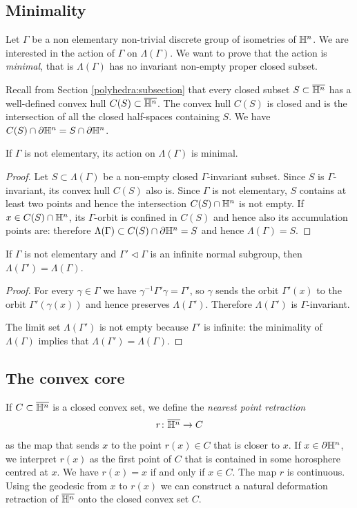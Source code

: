 \subsection{Minimality}
Let $\Gamma$ be a non elementary non-trivial discrete group of isometries of $\mathbb{H}^n$.
We are interested in the action of $\Gamma$ on $\Lambda(\Gamma)$. We want to prove that the action is \emph{minimal}, that is $\Lambda(\Gamma)$ has no invariant non-empty proper closed subset.

Recall from Section \ref{polyhedra:subsection} that every closed subset $S\subset \overline{\mathbb{H}^n}$ has a well-defined convex hull $C(S)\subset \overline{\mathbb{H}^n}$. The convex hull $C(S)$ is closed and is the intersection of all the closed half-spaces containing $S$. We have $C(S) \cap \partial \mathbb{H}^n = S \cap \partial \mathbb{H}^n$.

\begin{prop}
If $\Gamma$ is not elementary, its action on $\Lambda(\Gamma)$ is minimal.
\end{prop}
\begin{proof}
Let $S\subset \Lambda(\Gamma)$ be a non-empty closed $\Gamma$-invariant subset. Since $S$ is $\Gamma$-invariant, its convex hull $C(S)$ also is. Since $\Gamma$ is not elementary, $S$ contains at least two points and hence the intersection $C(S)\cap \mathbb{H}^n$ is not empty. If $x\in C(S)\cap \mathbb{H}^n$, its $\Gamma$-orbit is confined in $C(S)$ and hence also its accumulation points are: therefore $\Lambda(\Gamma)\subset C(S)\cap \partial \mathbb{H}^n = S$ and hence $\Lambda(\Gamma) = S$.
\end{proof}

\begin{cor} \label{normal:limit:cor}
If $\Gamma$ is not elementary and $\Gamma' \triangleleft \Gamma$ is an infinite normal subgroup, then $\Lambda(\Gamma') = \Lambda (\Gamma)$.
\end{cor}
\begin{proof}
For every $\gamma \in \Gamma$ we have $\gamma^{-1}\Gamma' \gamma = \Gamma'$, so $\gamma$ sends the orbit $\Gamma'(x)$ to the orbit $\Gamma'(\gamma(x))$ and hence preserves $\Lambda(\Gamma')$. Therefore $\Lambda(\Gamma')$ is $\Gamma$-invariant.

The limit set $\Lambda(\Gamma')$ is not empty because $\Gamma'$ is infinite: the minimality of $\Lambda(\Gamma)$ implies that $\Lambda(\Gamma') = \Lambda(\Gamma)$.
\end{proof}

\subsection{The convex core}
If $C\subset \overline{\mathbb{H}^n}$ is a closed convex set, we define the \emph{nearest point retraction} 
$$r\colon \overline{\mathbb{H}^n} \to C$$ 
as the map that sends $x$ to the point $r(x)\in C$ that is closer to $x$. If $x\in\partial \mathbb{H}^n$, we interpret $r(x)$ as the first point of $C$ that is contained in some horosphere centred at $x$. We have $r(x)=x$ if and only if $x\in C$. The map $r$ is continuous. Using the geodesic from $x$ to $r(x)$ we can construct a natural deformation retraction of $\overline{\mathbb{H}^n}$ onto the closed convex set $C$.

